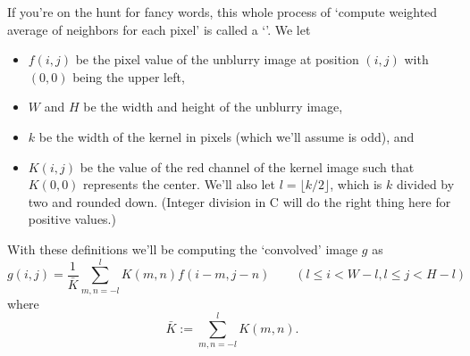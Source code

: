 \documentclass[11pt]{article}
\begin{document}
If you're on the hunt for fancy words, this whole process of `compute
weighted average of neighbors for each pixel' is called a
`'.
We let
\begin{itemize}
  \item $f(i,j)$ be the pixel value of the unblurry image at position $(i,j)$ with $(0,0)$
    being the upper left,
  \item $W$ and $H$ be the width and height of the unblurry image,
  \item $k$ be the width of the kernel in pixels (which
    we'll assume is odd), and
  \item $K(i,j)$ be the value of the red channel of the
    kernel image such that $K(0,0)$ represents the center.
    We'll also let $l=\lfloor k/2\rfloor$, which is $k$ divided
    by two and rounded down. (Integer division in C will do the right
    thing here for positive values.)
\end{itemize}
With these definitions we'll be computing the `convolved' image $g$ as
\[
  g(i,j)=\frac{1}{\bar K} \sum_{m,n=-l}^l K(m,n)f(i-m,j-n)
  \qquad
  (l\le i <W-l,l\le j<H-l)
\]
where
\[
  \bar K:=\sum_{m,n=-l}^l K(m,n).
\]
\end{document}
